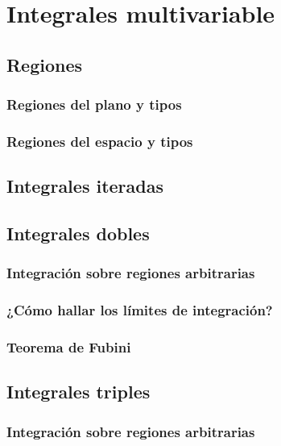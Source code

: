 \documentclass[12pt, fleqn]{report}                             %
\theoremstyle{break}                                            %
\begin{document}
    \chapter{Integrales multivariable}
    
        \section{Regiones}
        
            \subsection{Regiones del plano y tipos}
            
            \subsection{Regiones del espacio y tipos}
        
        \section{Integrales iteradas}
        
        \section{Integrales dobles}
            
            \subsection{Integración sobre regiones arbitrarias}
            
            \subsection{¿Cómo hallar los límites de integración?}
            
            \subsection{Teorema de Fubini}
        
        \section{Integrales triples}
            
            \subsection{Integración sobre regiones arbitrarias}
            
\end{document}
